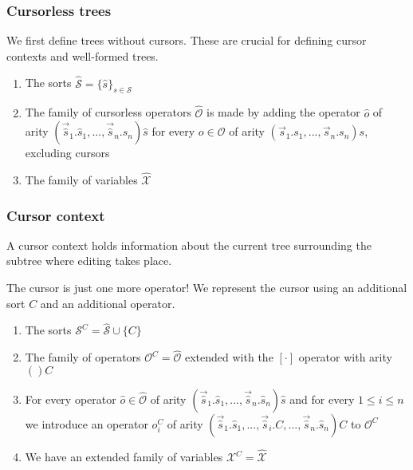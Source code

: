 \documentclass[t,24pt,aspectratio=169]{beamer}
\begin{document}
\begin{frame}
    \frametitle{Cursorless trees}

    We first define trees without cursors. These are crucial for
    defining cursor contexts and well-formed trees. 

    \begin{enumerate}
        \item The sorts $\hat{\mathcal{S}} = \{ \hat{s} \}_{s \in \mathcal{S}}$
        \item The family of cursorless operators $\hat{\mathcal{O}}$ is made by adding
              the operator $\hat{o}$ of arity
              $(\vec{\hat{s}}_1.\hat{s}_1,...,\vec{\hat{s}}_n.\hat{s}_n)\hat{s}$
              for every $o \in \mathcal{O}$ of arity $(\vec{s}_1.s_1,...,\vec{s}_n.s_n)s$, excluding cursors
        \item The family of variables $\hat{\mathcal{X}}$
    \end{enumerate}
\end{frame}

\begin{frame}
    \frametitle{Cursor context}

    A cursor context holds information about the current tree
    surrounding the subtree where editing takes place.

    The cursor is just one more operator! We represent the cursor
    using an additional sort $C$ and an additional operator.
    
    \begin{enumerate}
        \item The sorts $\mathcal{S}^C = \hat{\mathcal{S}} \cup \{C\}$
        \item The family of operators $\mathcal{O}^C = \hat{\mathcal{O}}$ extended with the $[\cdot]$ operator with arity $()C$
        \item For every operator $\hat{o} \in \hat{\mathcal{O}}$ of
          arity
          $(\vec{\hat{s}}_1.\hat{s}_1,...,\vec{\hat{s}}_n.\hat{s}_n)\hat{s}$
          and for every $1 \leq i \leq n$ we introduce an operator $o_i^C$ of arity $(\vec{\hat{s}}_1.\hat{s}_1,...,\vec{\hat{s}}_i.C,...,\vec{\hat{s}}_n.\hat{s}_n)C$ to $\mathcal{O}^C$
        \item We have an extended family of variables $\mathcal{X}^C = \hat{\mathcal{X}}$
    \end{enumerate}
\end{frame}
\end{document}
